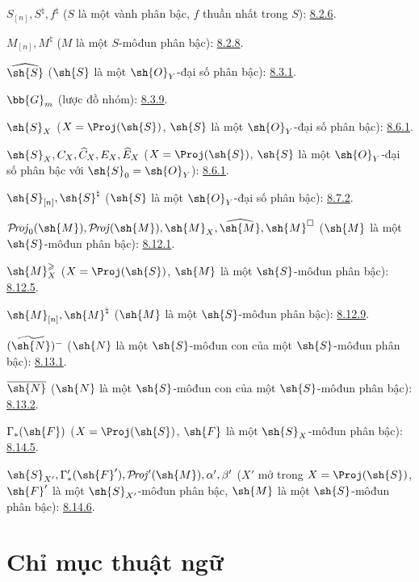 \documentclass[oneside,10pt]{amsart}
\renewcommand{\geq}{\geqslant}
\def\shProj{\mathcal{P}\!\mathit{roj}}
\newcommand{\oldpage}[2][]{\marginnote{\normalfont\footnotesize\textbf{#1}~|~#2}\ignorespaces}
\begin{document}
$S_{[n]},S^\natural,f^\natural$
($S$ là một vành phân bậc, $f$ thuần nhất trong $S$): \hyperref[II.8.2.6]{8.2.6}.

$M_{[n]},M^\natural$ ($M$ là một $S$-môđun phân bậc): \hyperref[II.8.2.8]{8.2.8}.

$\widehat{\sh{S}}$ ($\sh{S}$ là một $\sh{O}_Y$-đại số phân bậc): \hyperref[II.8.3.1]{8.3.1}.

$\bb{G}_m$ (lược đồ nhóm): \hyperref[II.8.3.9]{8.3.9}.

$\sh{S}_X$ ($X=\Proj(\sh{S})$, $\sh{S}$ là một $\sh{O}_Y$-đại số phân bậc): \hyperref[II.8.6.1]{8.6.1}.

$\sh{S}_X,C_X,\widehat C_X,E_X,\widehat E_X$
($X=\Proj(\sh{S})$, $\sh{S}$ là một $\sh{O}_Y$-đại số phân bậc
với $\sh{S}_0=\sh{O}_Y$): \hyperref[II.8.6.1]{8.6.1}.

$\sh{S}_{[n]},\sh{S}^{\natural}$
($\sh{S}$ là một $\sh{O}_Y$-đại số phân bậc): \hyperref[II.8.7.2]{8.7.2}.

$\shProj_0(\sh{M}),\shProj(\sh{M}),\sh{M}_X,
\widehat{\sh{M}},\sh{M}^{\square}$
($\sh{M}$ là một $\sh{S}$-môđun phân bậc): \hyperref[II.8.12.1]{8.12.1}.

$\sh{M}_X^\geq$
($X=\Proj(\sh{S})$, $\sh{M}$ là một $\sh{S}$-môđun phân bậc): \hyperref[II.8.12.5]{8.12.5}.

$\sh{M}_{[n]},\sh{M}^{\natural}$
($\sh{M}$ là một $\sh{S}$-môđun phân bậc): \hyperref[II.8.12.9]{8.12.9}.

$(\widetilde{\sh{N}})^-$
($\sh{N}$ là một $\sh{S}$-môđun con của một $\sh{S}$-môđun phân bậc): \hyperref[II.8.13.1]{8.13.1}.

$\overline{\sh{N}}$
($\sh{N}$ là một $\sh{S}$-môđun con của một $\sh{S}$-môđun phân bậc): \hyperref[II.8.13.2]{8.13.2}.

$\Gamma_*(\sh{F})$
($X=\Proj(\sh{S})$, $\sh{F}$ là một $\sh{S}_X$-môđun phân bậc): \hyperref[II.8.14.5]{8.14.5}.

$\sh{S}_{X'},\Gamma'_*(\sh{F}'),\shProj'(\sh{M}),
\alpha',\beta'$
($X'$ mở trong $X=\Proj(\sh{S})$, $\sh{F}'$ là một $\sh{S}_{X'}$-môđun phân bậc,
$\sh{M}$ là một $\sh{S}$-môđun phân bậc): \hyperref[II.8.14.6]{8.14.6}.

\endgroup

\clearpage
\oldpage[II]{209}
{}
\section*{Chỉ mục thuật ngữ}
\end{document}

